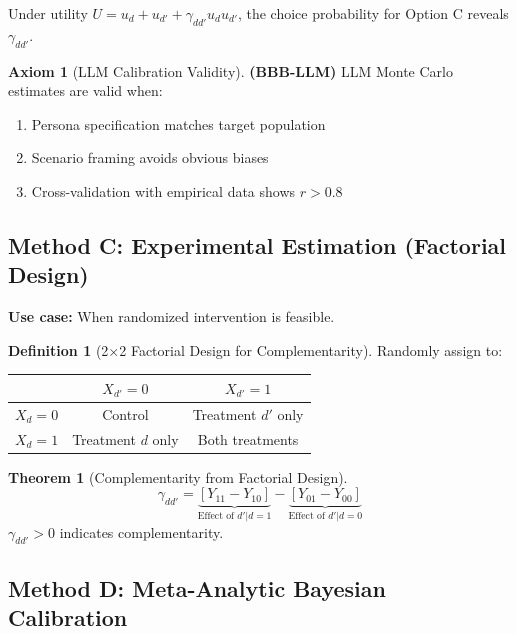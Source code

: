 \documentclass[11pt,a4paper]{article}
\theoremstyle{definition}
\newtheorem{definition}{Definition}[section]
\newtheorem{axiom}{Axiom}[section]
\newtheorem{theorem}{Theorem}[section]
\begin{document}
Under utility $U = u_d + u_{d'} + \gamma_{dd'} u_d u_{d'}$, the choice probability 
for Option C reveals $\gamma_{dd'}$.

\begin{axiom}[LLM Calibration Validity]
\label{ax:bbb-llm}
\textbf{(BBB-LLM)} LLM Monte Carlo estimates are valid when:
\begin{enumerate}
    \item Persona specification matches target population
    \item Scenario framing avoids obvious biases
    \item Cross-validation with empirical data shows $r > 0.8$
\end{enumerate}
\end{axiom}

\subsection{Method C: Experimental Estimation (Factorial Design)}

\textbf{Use case:} When randomized intervention is feasible.

\begin{definition}[2$\times$2 Factorial Design for Complementarity]
Randomly assign to:
\begin{center}
\begin{tabular}{c|cc}
& $X_{d'} = 0$ & $X_{d'} = 1$ \\
\hline
$X_d = 0$ & Control & Treatment $d'$ only \\
$X_d = 1$ & Treatment $d$ only & Both treatments \\
\end{tabular}
\end{center}
\end{definition}

\begin{theorem}[Complementarity from Factorial Design]
\begin{equation}
\gamma_{dd'} = \underbrace{[Y_{11} - Y_{10}]}_{\text{Effect of } d' | d=1} - \underbrace{[Y_{01} - Y_{00}]}_{\text{Effect of } d' | d=0}
\end{equation}
$\gamma_{dd'} > 0$ indicates complementarity.
\end{theorem}

\subsection{Method D: Meta-Analytic Bayesian Calibration}
\end{document}

